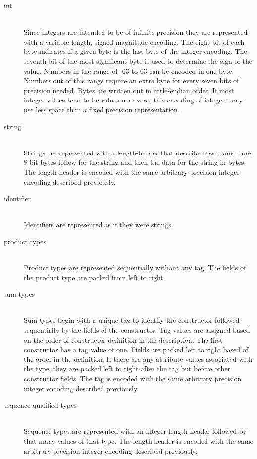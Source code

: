 \begin{description}
  \item[int] \mbox{}\\
    Since \asdl{} integers are intended to be of infinite precision they are
    represented with a variable-length, signed-magnitude encoding.  The
    eight bit of each byte indicates if a given byte is the last byte of
    the integer encoding. The seventh bit of the most significant byte is
    used to determine the sign of the value. Numbers in the range of -63
    to 63 can be encoded in one byte. Numbers out of this range require an
    extra byte for every seven bits of precision needed.  Bytes are
    written out in little-endian order. If most integer values tend to be
    values near zero, this encoding of integers may use less space than a
    fixed precision representation.

  \item[string] \mbox{}\\
    Strings are represented with a length-header that describe how many more
    8-bit bytes follow for the string and then the data for the string in
    bytes. The length-header is encoded with the same arbitrary precision
    integer encoding described previously.

  \item[identifier] \mbox{}\\
    Identifiers are represented as if they were strings. 

  \item[product types] \mbox{}\\ 
    Product types are represented sequentially without any tag. The fields of
    the product type are packed from left to right.

  \item[sum types] \mbox{}\\
    Sum types begin with a unique tag to identify the constructor
    followed sequentially by the fields of the constructor.  Tag values are
    assigned based on the order of constructor definition in the
    description. The first constructor has a tag value of one. Fields are packed
    left to right based of the order in the definition.  If there are any
    attribute values associated with the type, they are packed left to right
    after the tag but before other constructor fields. The tag is encoded with
    the same arbitrary precision integer encoding described previously.

  \item[sequence qualified types] \mbox{}\\
    Sequence types are represented with an integer length-header followed by
    that many values of that type. The length-header is encoded with the same
    arbitrary precision integer encoding described previously.


\end{description}
